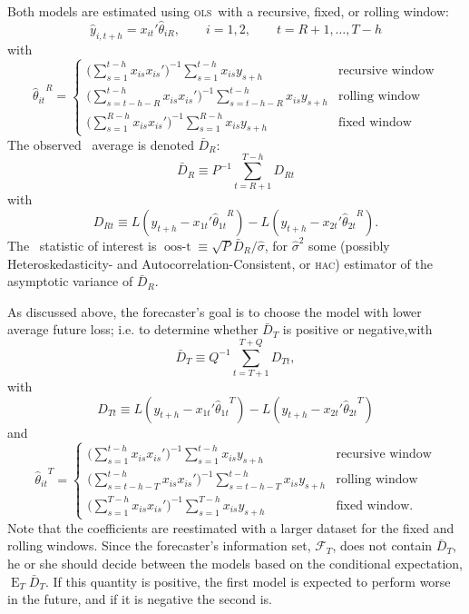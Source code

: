 \documentclass[11pt]{article}
\DeclareMathOperator{\E}{E}
\newcommand{\oosA}{\bar{D}_{R}}
\newcommand{\oosB}{\bar{D}_{T}}
\newcommand{\oost}{\ensuremath{\operatorname{oos-t}}}
\newcommand{\oosSum}[2]{\ensuremath{\sum_{#1=R+#2}^{T-\h}}}
\newcommand{\h}{h}
\newcommand{\bh}[1]{\ensuremath{\hat\theta_{#1}}}
\newcommand{\ols}{\textsc{ols}}
\newcommand{\hac}{\textsc{hac}}
\begin{document}
Both models are estimated using \ols\ with a recursive, fixed, or
rolling window:
\[
\hat y_{i,t+\h} = x_{it}'\bh{iR}, \qquad i=1,2, \qquad t = R+1,\dots,T-h
\]
with
\begin{equation*}
\bh{it}^{R} = \begin{cases} \big(\sum_{s=1}^{t-\h} x_{is}x_{is}'\big)^{-1}
\sum_{s=1}^{t-\h} x_{is} y_{s+\h} & \text{recursive window}\\
 \big(\sum_{s=t - \h - R}^{t-\h} x_{is}x_{is}'\big)^{-1}
\sum_{s=t - \h - R}^{t-\h} x_{is} y_{s+\h} & \text{rolling window} \\
 \big(\sum_{s=1}^{R-\h} x_{is}x_{is}'\big)^{-1} 
\sum_{s=1}^{R-\h} x_{is} y_{s+\h} & \text{fixed window}
\end{cases}
\end{equation*}
The observed \oos\ average is denoted $\oosA$: \[\oosA \equiv P^{-1}
\oosSum{t}{1} D_{Rt}\]  with
\[
D_{Rt} \equiv L(y_{t+\h} - x_{1t}'\bh{1t}^R) - L(y_{t+\h}
  - x_{2t}'\bh{2t}^R).
\]
The \oos\ statistic of interest is $\oost \equiv \sqrt{P} \oosA /
\hat\sigma$, for $\hat\sigma^2$ some (possibly Heteroskedasticity- and
Autocorrelation-Consistent, or \hac) estimator of the asymptotic
variance of $\oosA$.

As discussed above, the forecaster's goal is to choose the model with
lower average future loss; i.e. to determine whether $\oosB$ is
positive or negative,with
\[
\oosB \equiv Q^{-1} \sum_{t=T+1}^{T+Q} D_{Tt},
\]
with
\[
D_{Tt} \equiv L(y_{t+h} - x_{1t}' \bh{1t}^T) - L(y_{t+h} - x_{2t}' \bh{2t}^T)
\]
and 
\begin{equation*}
\bh{it}^{T} = \begin{cases} \big(\sum_{s=1}^{t-\h} x_{is}x_{is}'\big)^{-1}
\sum_{s=1}^{t-\h} x_{is} y_{s+\h} & \text{recursive window}\\
 \big(\sum_{s=t - \h - T}^{t-\h} x_{is}x_{is}'\big)^{-1}
\sum_{s=t - \h - T}^{t-\h} x_{is} y_{s+\h} & \text{rolling window} \\
 \big(\sum_{s=1}^{T-\h} x_{is}x_{is}'\big)^{-1} 
\sum_{s=1}^{T-\h} x_{is} y_{s+\h} & \text{fixed window}.
\end{cases}
\end{equation*}
Note that the coefficients are reestimated with a larger dataset for
the fixed and rolling windows.  Since the forecaster's information
set, $\mathcal{F}_T$, does not contain $\oosB$, he or she should
decide between the models based on the conditional expectation, $\E_T
\oosB$. If this quantity is positive, the first model is expected to
perform worse in the future, and if it is negative the second is.
\end{document}
